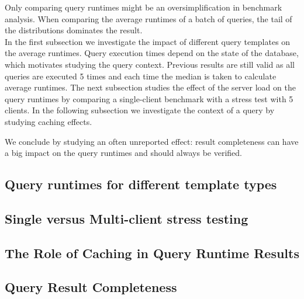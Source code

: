 Only comparing query runtimes might be an oversimplification in benchmark analysis. 
When comparing the average runtimes of a batch of queries, the tail of the distributions dominates the result. 
 \\
In the first subsection
we investigate the impact of different query templates on the average runtimes.
Query execution times depend on the state of the database, which motivates studying the query context. Previous results are still valid as all queries are executed 5 times and each time the median is taken to calculate average runtimes.
The next subsection
studies the effect of the server load on the query runtimes by comparing a single-client benchmark with a stress test with 5 clients. In the following subsection we investigate the context of a query by studying caching effects. 

We conclude by studying an often unreported effect: result completeness can have a big impact on the query runtimes and should always be verified.

\subsection{Query runtimes for different template types}
\label{subsec:templates}


\subsection{Single versus Multi-client stress testing}
\label{subsec:load}


\subsection{The Role of Caching in Query Runtime Results}
\label{subsec:caching}






\subsection{Query Result Completeness}
\label{subsec:completeness}
